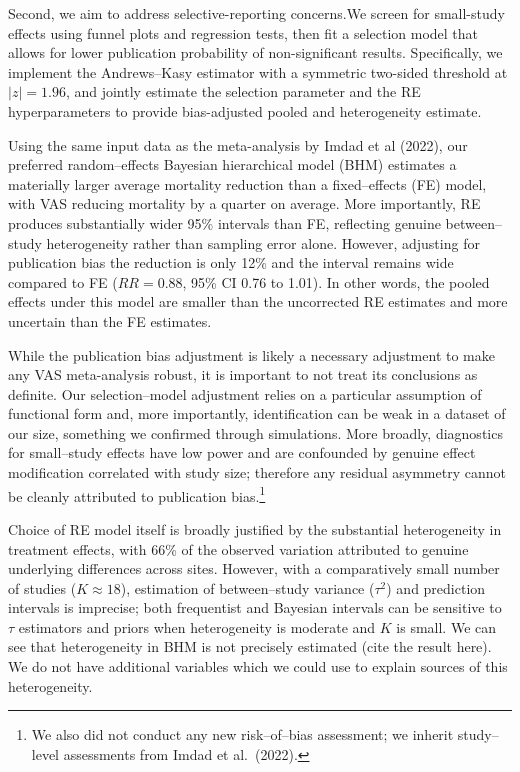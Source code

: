 \documentclass[12pt]{article}
\begin{document}
Second, we aim to address selective-reporting concerns.We screen for small-study effects using funnel plots and regression tests, then fit a selection model that allows for lower publication probability of non-significant results. Specifically, we implement the Andrews–Kasy estimator with a symmetric two-sided threshold at $\lvert z\rvert = 1.96$, and jointly estimate the selection parameter and the RE hyperparameters to provide bias-adjusted pooled and heterogeneity estimate.

Using the same input data as the meta-analysis by Imdad et al (2022), our preferred random–effects Bayesian hierarchical model (BHM) estimates a materially larger average mortality reduction than a fixed–effects (FE) model, with VAS reducing mortality by a quarter on average. More importantly, RE produces substantially wider 95\% intervals than FE, reflecting genuine between–study heterogeneity rather than sampling error alone. 
However, adjusting for publication bias the reduction is only 12\% and the interval remains wide compared to FE ($RR = 0.88$, 95\% CI 0.76 to 1.01). In other words, the pooled effects under this model are smaller than the uncorrected RE estimates and more uncertain than the FE estimates. 

While the publication bias adjustment is likely a necessary adjustment to make any VAS meta-analysis robust, it is important to not treat its conclusions as definite. Our selection–model adjustment relies on a particular assumption of functional form and, more importantly, identification can be weak in a dataset of our size, something we confirmed through simulations. More broadly, diagnostics for small–study effects have low power and are confounded by genuine effect modification correlated with study size; therefore any residual asymmetry cannot be cleanly attributed to publication bias.\footnote{We also did not conduct any new risk–of–bias assessment; we inherit study–level assessments from Imdad et al.\ (2022).}

Choice of RE model itself is broadly justified by the substantial heterogeneity in treatment effects, with 66\% of the observed variation attributed to genuine underlying differences across sites. 
However, with a comparatively small number of studies ($K\approx 18$), estimation of between–study variance ($\tau^2$) and prediction intervals is imprecise; both frequentist and Bayesian intervals can be sensitive to $\tau$ estimators and priors when heterogeneity is moderate and $K$ is small. We can see that heterogeneity in BHM is not precisely estimated (cite the result here). We do not have additional variables which we could use to explain sources of this heterogeneity.
\end{document}
